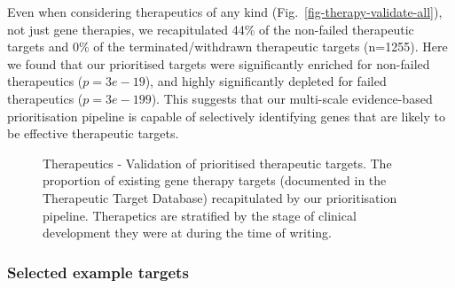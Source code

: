 \documentclass[
sn-nature
]{sn-jnl}
\begin{document}
Even when considering therapeutics of any kind
(Fig.~\ref{fig-therapy-validate-all}), not just gene therapies, we
recapitulated 44\% of the non-failed therapeutic targets and 0\% of the
terminated/withdrawn therapeutic targets (n=1255). Here we found that
our prioritised targets were significantly enriched for non-failed
therapeutics (\(p=3e-19\)), and highly significantly depleted for failed
therapeutics (\(p=3e-199\)). This suggests that our multi-scale
evidence-based prioritisation pipeline is capable of selectively
identifying genes that are likely to be effective therapeutic targets.

\label{cell-fig-therapy-validate}
\begin{figure}[H]


\caption{\label{fig-therapy-validate}Therapeutics - Validation of
prioritised therapeutic targets. The proportion of existing gene therapy
targets (documented in the Therapeutic Target Database) recapitulated by
our prioritisation pipeline. Therapetics are stratified by the stage of
clinical development they were at during the time of writing.}

\end{figure}%

\subsubsection{Selected example targets}\label{selected-example-targets}
\end{document}
